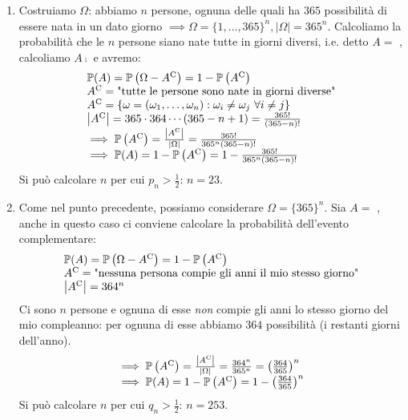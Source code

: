 \begin{enumerate}
	\item Costruiamo $\Omega $: abbiamo $n$ persone, ognuna delle quali ha $365$ possibilità di essere nata in un dato giorno $\implies \Omega =\{1,\dots,365\}^{n} ,| \Omega | =365^{n}$. Calcoliamo la probabilità che le $n$ persone siano nate tutte in giorni diversi, i.e. detto $A=$ , calcoliamo $A\comp$ e avremo:
	\begin{equation*}
		\begin{array}{ l }
			\mathbb{P}(A) =\mathbb{P}\left(\Omega -A^{\mathrm{C}}\right) =1-\mathbb{P}\left(A^{\mathrm{C}}\right)\\
			A^{\mathrm{C}} =\text{"tutte le persone sono nate in giorni diverse"}\\
			A^{\mathrm{C}} =\{\omega =(\omega _{1} ,\dots ,\omega _{n}) :\omega _{i} \neq \omega _{j} \ \forall i\neq j\}\\
			\left| A^{\mathrm{C}}\right| =365\cdot 364\cdots (365-n+1) =\frac{365!}{(365-n) !}\\
			\implies \mathbb{P}\left(A^{\mathrm{C}}\right) =\frac{\left| A^{\mathrm{C}}\right| }{| \Omega | } =\frac{365!}{365^{n}(365-n) !}\\
			\implies \mathbb{P}(A) =1-\mathbb{P}\left(A^{\mathrm{C}}\right) =1-\frac{365!}{365^{n}(365-n) !}
		\end{array}
	\end{equation*}
	Si può calcolare $n$ per cui $p_{n}  >\frac{1}{2}$: $n=23$.
	\item Come nel punto precedente, possiamo considerare $\Omega =\{365\}^{n}$. Sia $A=$ , anche in questo caso ci conviene calcolare la probabilità dell'evento complementare:
	\begin{equation*}
		\begin{array}{ l }
			\mathbb{P}(A) =\mathbb{P}\left(\Omega -A^{\mathrm{C}}\right) =1-\mathbb{P}\left(A^{\mathrm{C}}\right)\\
			A^{\mathrm{C}} =\text{"nessuna persona compie gli anni il mio stesso giorno"}\\
			\left| A^{\mathrm{C}}\right| =364^{n}
		\end{array}
	\end{equation*}
	Ci sono $n$ persone e ognuna di esse \textit{non} compie gli anni lo stesso giorno del mio compleanno: per ognuna di esse abbiamo $364$ possibilità (i restanti giorni dell'anno).
	\begin{equation*}
		\begin{array}{ l }
			\implies \mathbb{P}\left(A^{\mathrm{C}}\right) =\frac{\left| A^{\mathrm{C}}\right| }{| \Omega | } =\frac{364^{n}}{365^{n}} =\left(\frac{364}{365}\right)^{n}\\
			\implies \mathbb{P}(A) =1-\mathbb{P}\left(A^{\mathrm{C}}\right) =1-\left(\frac{364}{365}\right)^{n}
		\end{array}
	\end{equation*}
	Si può calcolare $n$ per cui $q_{n}  >\frac{1}{2}$: $n=253$.
\end{enumerate}

